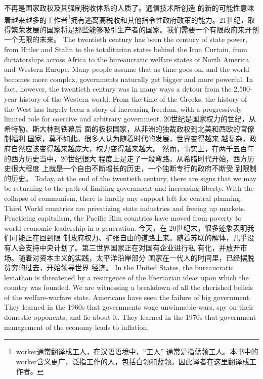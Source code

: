 \begin{paracol}{2}
不再是国家政权及其强制税收体系的人质了。通信技术所创造
的新的可能性意味着越来越多的工作者\footnote{worker通常翻译成工人，在汉语语境中，“工人” 通常是指蓝领工人。本书中的worker含义更广，泛指工作的人，包括白领和蓝领。因此译者在这里翻译成工作者。}拥有逃离高税收和其他指令性政府政策的能力。21世纪，取得繁荣发展的国家将是那些能够吸引生产者的国家。我们需要一个有限政府来开创一个无限的未来。
\switchcolumn*
The twentieth century has been the century of state power,
from Hitler and Stalin to the totalitarian states behind the Iron
Curtain, from dictatorships across Africa to the bureaucratic
welfare states of North America and Western Europe. Many
people assume that as time goes on, and the world becomes
more complex, governments naturally get bigger and more
powerful. In fact, however, the twentieth century was in many
ways a detour from the 2,500-year history of the Western
world. From the time of the Greeks, the history of the West has
largely been a story of increasing freedom, with a progressively
limited role for coercive and arbitrary government.
\switchcolumn
20世纪是国家权力的世纪，从希特勒、斯大林到铁幕后
面的极权国家，从非洲的独裁政权到北美和西欧的官僚制福利
国家，莫不如此。很多人认为随着时代的发展，世界变得越来
越复杂，政府自然应该变得越来越庞大，权力变得越来越大。
然而，事实上，在两千五百年的西方历史当中，20世纪很大
程度上是走了一段弯路。从希腊时代开始，西方历史很大程度
上就是一个自由不断增长的历史，一个独断专行的政府不断受
到限制的历史。
\switchcolumn*
Today, at the end of the twentieth century, there are signs that
we may be returning to the path of limiting government and increasing liberty. With the collapse of communism, there is
hardly any support left for central planning. Third World countries are privatizing state industries and freeing up markets.
Practicing capitalism, the Pacific Rim countries have moved
from poverty to world economic leadership in a generation.
\switchcolumn
今天，在 20世纪末，很多迹象表明我们可能正在回到限
制政府权力、扩张自由的道路上来。随着苏联的解体，几乎没
有人会支持中央计划了。第三世界国家正在对国有企业进行私
有化，并放开市场。随着对资本主义的实践，太平洋沿岸部分
国家在一代人的时间里，已经摆脱贫穷的过去，开始领导世界
经济。
\switchcolumn*
In the United States, the bureaucratic leviathan is threatened
by a resurgence of the libertarian ideas upon which the country
was founded. We are witnessing a breakdown of all the cherished beliefs of the welfare-warfare state. Americans have seen
the failure of big government. They learned in the 1960s that
governments wage unwinnable wars, spy on their domestic opponents, and lie about it. They learned in the 1970s that government management of the economy leads to inflation,

\end{paracol}
